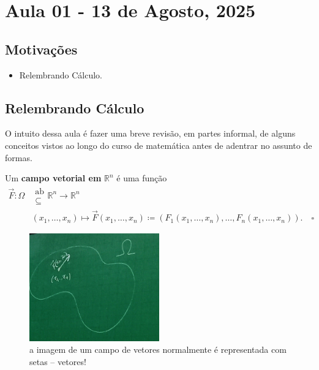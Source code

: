 \documentclass[../differential_forms.tex]{subfiles}
\begin{document}
\section{Aula 01 - 13 de Agosto, 2025}
\subsection{Motivações}
\begin{itemize}
	\item Relembrando Cálculo.
\end{itemize}
\subsection{Relembrando Cálculo}
O intuito dessa aula é fazer uma breve revisão, em partes informal, de alguns conceitos vistos ao longo do curso de matemática antes de adentrar no assunto de formas.
\begin{def*}
	Um \textbf{campo vetorial em }\(\mathbb{R}^{n}\) é uma função
	\begin{align*}
		\vec{F}:\Omega & \substack{\mathrm{ab}                                                                                                                                  \\ \subseteq }\mathbb{R}^{n} \rightarrow \mathbb{R}^{n} \\
		               & (x_1, \dotsc , x_{n})\longmapsto \vec{F}(x_1, \dotsc , x_{n}) \coloneqq (F_1(x_1, \dotsc , x_{n}), \dotsc , F_{n}(x_1, \dotsc , x_{n})). \quad \square
	\end{align*}
\end{def*}
\begin{figure}[H]
	\begin{center}
		\includegraphics[height=0.5\textheight, width=0.5\textwidth, keepaspectratio]{./Images/vector_field_01.png}
	\end{center}
	\caption{a imagem de um campo de vetores normalmente é representada com setas -- vetores!}
\end{figure}
\end{document}
